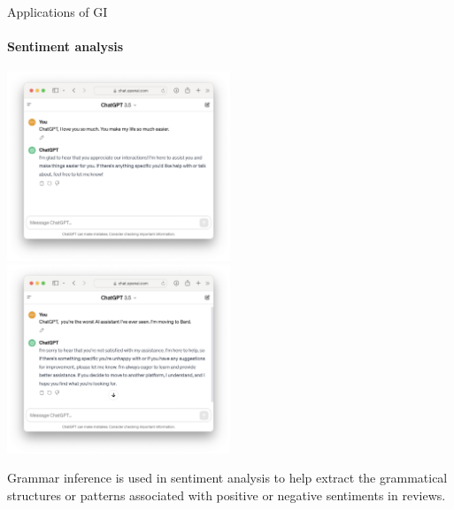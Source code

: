 \documentclass{beamer}
\begin{document}
	\begin{frame}{Applications of GI}
		\framesubtitle{Sentiment analysis}

		\includegraphics[width=0.5\textwidth]{img/chatgpt1.png}%
		\includegraphics[width=0.5\textwidth]{img/chatgpt2.png}

		Grammar inference is used in sentiment analysis to help extract the grammatical structures or patterns associated with positive or negative sentiments in reviews.
	\end{frame}


\end{document}

